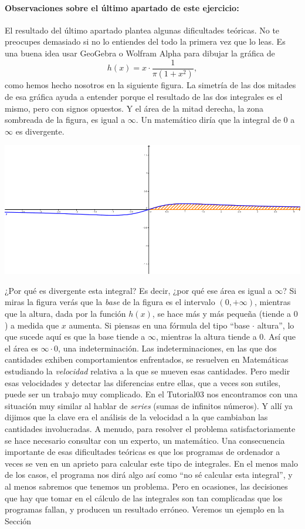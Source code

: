 \documentclass[10pt,a4paper]{article}\usepackage[]{graphicx}\usepackage[]{color}
\newcounter{cont01}
\begin{document}
\paragraph{Observaciones sobre el último apartado de este ejercicio:}
\label{tut05:parag:IntegralMediaCauchyNoConverge}
El resultado del último apartado plantea algunas dificultades teóricas. No te preocupes demasiado si no lo entiendes del todo la primera vez que lo leas. Es una buena idea usar GeoGebra o Wolfram Alpha para dibujar la gráfica de
\[h(x) = x\cdot \dfrac{1}{\pi(1+x^2)},\]
como hemos hecho nosotros en la siguiente figura. La simetría de las dos mitades de esa gráfica ayuda a entender porque el resultado de las dos integrales es el mismo, pero con signos opuestos. Y el área de la mitad derecha, la zona sombreada de la figura, es igual a $\infty$. Un matemático diría que la integral de $0$ a $\infty$ es {\sf divergente}.
\begin{center}
\includegraphics[width=14cm]{../fig/Tut05-69.png}
\end{center}
¿Por qué es divergente esta integral? Es decir, ¿por qué ese área es igual a $\infty$? Si miras la figura verás que la {\em base} de la figura es el intervalo $(0, +\infty)$, mientras que la altura, dada por la función $h(x)$, se hace más y más pequeña (tiende a $0$) a medida que $x$ aumenta. Si piensas en una fórmula del tipo ``base $\cdot$ altura'', lo que sucede aquí es que la base tiende a $\infty$, mientras la altura tiende a $0$. Así que el área es $\infty \cdot 0$, una indeterminación. Las indeterminaciones, en las que dos cantidades exhiben comportamientos enfrentados, se resuelven en Matemáticas estudiando la {\em velocidad} relativa a la que se mueven esas cantidades. Pero medir esas velocidades y detectar las diferencias entre ellas, que a veces son sutiles, puede ser un trabajo muy complicado. En el Tutorial03 nos encontramos con una situación muy similar al hablar de {\em series} (sumas de infinitos números). Y allí ya dijimos que la clave era el análisis de la velocidad a la que cambiaban las cantidades involucradas. A menudo, para resolver el problema satisfactoriamente se hace necesario consultar con un experto, un matemático. Una consecuencia importante de esas dificultades teóricas es que los programas de ordenador a veces se ven en un aprieto para calcular este tipo de integrales. En el menos malo de los casos,  el programa nos dirá algo así como ``no sé calcular esta integral'', y al menos sabremos que tenemos un problema. Pero en ocasiones, las decisiones que hay que tomar en el cálculo de las integrales son  tan complicadas que los programas fallan, y producen un resultado erróneo. Veremos un ejemplo en la Sección
\end{document}
